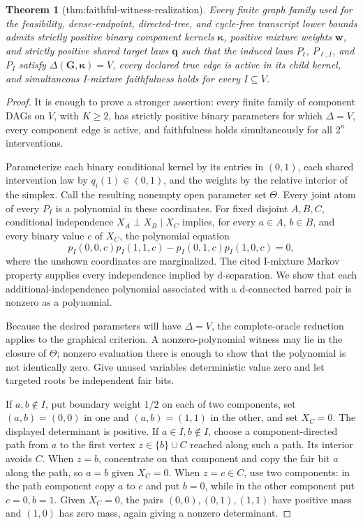 \documentclass{article}
\newtheorem{theorem}{Theorem}
\begin{document}
\begin{theorem}[thm:faithful-witness-realization]\label{thm:faithful-witness-realization}
Every finite graph family used for the feasibility, dense-endpoint, directed-tree, and cycle-free transcript lower bounds admits strictly positive binary component kernels \(\boldsymbol\kappa\), positive mixture weights \(\mathbf w\), and strictly positive shared target laws \(\mathbf q\) such that the induced laws \(P_\ell\), \(P_{\ell,I}\), and \(P_I\) satisfy \(\Delta(\mathbf G,\boldsymbol\kappa)=V\), every declared true edge is active in its child kernel, and simultaneous I-mixture faithfulness holds for every \(I\subseteq V\).
\end{theorem}
\begin{proof}
It is enough to prove a stronger assertion: every finite family of component DAGs on \(V\), with \(K\ge2\), has strictly positive binary parameters for which \(\Delta=V\), every component edge is active, and faithfulness holds simultaneously for all \(2^n\) interventions.

Parameterize each binary conditional kernel by its entries in \((0,1)\), each shared intervention law by \(q_i(1)\in(0,1)\), and the weights by the relative interior of the simplex. Call the resulting nonempty open parameter set \(\Theta\). Every joint atom of every \(P_I\) is a polynomial in these coordinates. For fixed disjoint \(A,B,C\), conditional independence \(X_A\perp X_B\mid X_C\) implies, for every \(a\in A\), \(b\in B\), and every binary value \(c\) of \(X_C\), the polynomial equation
\[
 p_I(0,0,c)p_I(1,1,c)-p_I(0,1,c)p_I(1,0,c)=0,
\]
where the unshown coordinates are marginalized. The cited I-mixture Markov property supplies every independence implied by d-separation. We show that each additional-independence polynomial associated with a d-connected barred pair is nonzero as a polynomial.

Because the desired parameters will have \(\Delta=V\), the complete-oracle reduction applies to the graphical criterion. A nonzero-polynomial witness may lie in the closure of \(\Theta\); nonzero evaluation there is enough to show that the polynomial is not identically zero. Give unused variables deterministic value zero and let targeted roots be independent fair bits.

If \(a,b\notin I\), put boundary weight \(1/2\) on each of two components, set \((a,b)=(0,0)\) in one and \((a,b)=(1,1)\) in the other, and set \(X_C=0\). The displayed determinant is positive. If \(a\in I,b\notin I\), choose a component-directed path from \(a\) to the first vertex \(z\in\{b\}\cup C\) reached along such a path. Its interior avoids \(C\). When \(z=b\), concentrate on that component and copy the fair bit \(a\) along the path, so \(a=b\) given \(X_C=0\). When \(z=c\in C\), use two components: in the path component copy \(a\) to \(c\) and put \(b=0\), while in the other component put \(c=0,b=1\). Given \(X_C=0\), the pairs \((0,0),(0,1),(1,1)\) have positive mass and \((1,0)\) has zero mass, again giving a nonzero determinant.


\end{proof}
\end{document}
